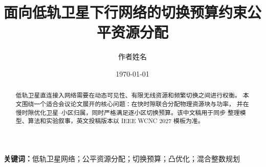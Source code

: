 \documentclass[UTF8,a4paper,11pt]{ctexart}
\title{面向低轨卫星下行网络的切换预算约束公平资源分配}
\author{作者姓名}
\date{\today}
\begin{document}
\maketitle

\begin{abstract}
低轨卫星直连接入网络需要在动态可见性、有限无线资源和频繁切换之间进行权衡。
本文围绕一个适合会议论文展开的核心问题：在快时隙联合分配物理资源块与功率，
并在慢时隙优化卫星--小区归属，同时严格满足逐小区切换预算。该中文稿用于同步
整理模型、算法和实验叙事，英文投稿版本以 IEEE WCNC 2027 模板为准。
\end{abstract}

\noindent\textbf{关键词：}低轨卫星网络；公平资源分配；切换预算；凸优化；混合整数规划










\end{document}
